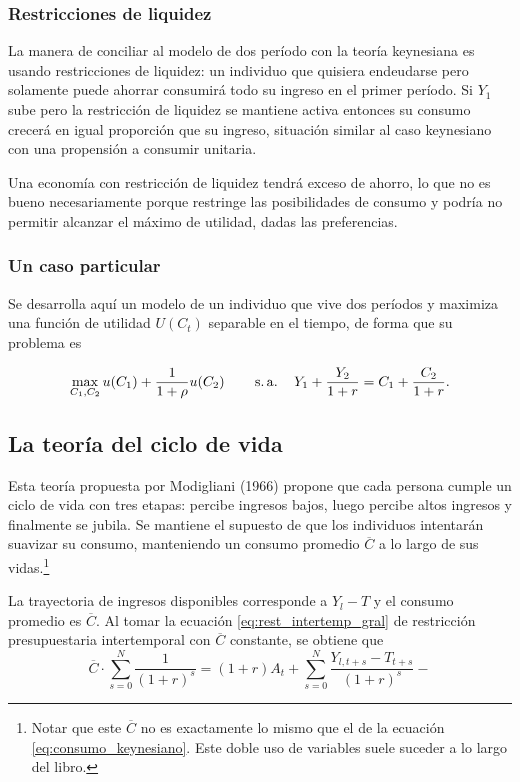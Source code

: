 \documentclass[DeGregorioResumen]{subfiles}
\begin{document}
\subsubsection{Restricciones de liquidez}

La manera de conciliar al modelo de dos período con la teoría keynesiana es usando restricciones de liquidez: un individuo que quisiera endeudarse pero solamente puede ahorrar consumirá todo su ingreso en el primer período. Si $Y_1$ sube pero la restricción de liquidez se mantiene activa entonces su consumo crecerá en igual proporción que su ingreso, situación similar al caso keynesiano con una propensión a consumir unitaria.

Una economía con restricción de liquidez tendrá exceso de ahorro, lo que no es bueno necesariamente porque restringe las posibilidades de consumo y podría no permitir alcanzar el máximo de utilidad, dadas las preferencias.

\subsubsection{Un caso particular}

Se desarrolla aquí un modelo de un individuo que vive dos períodos y maximiza una función de utilidad $U(C_t)$ separable en el tiempo, de forma que su problema es

\begin{equation*}
\max_{C_1,C_2} u(C_1)+\frac{1}{1+\rho} u(C_2) \operatorname{\qquad s.a.\quad} Y_1+\frac{Y_2}{1+r}=C_1+\frac{C_2}{1+r}.
\end{equation*}

\subsection{La teoría del ciclo de vida}

Esta teoría propuesta por Modigliani (1966) propone que cada persona cumple un ciclo de vida con tres etapas: percibe ingresos bajos, luego percibe altos ingresos y finalmente se jubila. Se mantiene el supuesto de que los individuos intentarán suavizar su consumo, manteniendo un consumo promedio $\overline{C}$ a lo largo de sus vidas.\footnote{Notar que este $\overline{C}$ no es exactamente lo mismo que el de la ecuación \eqref{eq:consumo_keynesiano}. Este doble uso de variables suele suceder a lo largo del libro.}



La trayectoria de ingresos disponibles corresponde a $Y_l-T$ y el consumo promedio es $\overline{C}$. Al tomar la ecuación \eqref{eq:rest_intertemp_gral} de restricción presupuestaria intertemporal con $\overline{C}$ constante, se obtiene que
\begin{equation*}
\overline{C}\cdot\sum_{s=0}^{N}{\frac{1}{(1+r)^s}} = (1+r)A_t + \sum_{s=0}^{N}{\frac{Y_{l,t+s}-T_{t+s}}{(1+r)^s}}-
\end{equation*}
\end{document}
